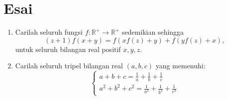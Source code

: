 \documentclass{article}
\begin{document}
	\section{Esai}
	\begin{enumerate}
		\item Carilah seluruh fungsi $f: \mathbb{R}^+ \to \mathbb{R}^+$ sedemikian sehingga
		$$(z + 1)f(x + y) = f(xf(z) + y) + f(yf(z) + x),$$untuk seluruh bilangan real positif $x, y, z$.
		
		\item Carilah seluruh tripel bilangan real $(a,b,c)$ yang memenuhi:
		$$\begin{cases} a+b+c=\frac{1}{a}+\frac{1}{b}+\frac{1}{c} \\a^2+b^2+c^2=\frac{1}{a^2}+\frac{1}{b^2}+\frac{1}{c^2}\end{cases}$$
	\end{enumerate}
\end{document}
